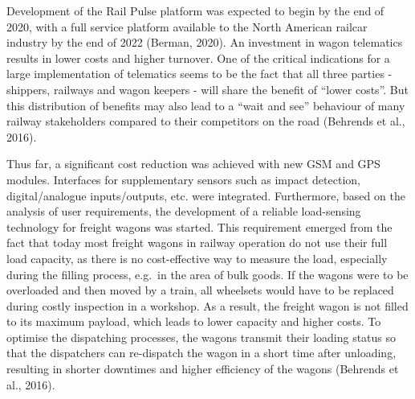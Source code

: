 \documentclass[
]{book}
\begin{document}
Development of the Rail Pulse platform was expected to begin by the end of 2020, with a full service platform available to the North American railcar industry by the end of 2022 (Berman, 2020).
An investment in wagon telematics results in lower costs and higher turnover. One of the critical indications for a large implementation of telematics seems to be the fact that all three parties - shippers, railways and wagon keepers - will share the benefit of ``lower costs''. But this distribution of benefits may also lead to a ``wait and see'' behaviour of many railway stakeholders compared to their competitors on the road (Behrends et al., 2016).

Thus far, a significant cost reduction was achieved with new GSM and GPS modules. Interfaces for supplementary sensors such as impact detection, digital/analogue inputs/outputs, etc. were integrated. Furthermore, based on the analysis of user requirements, the development of a reliable load-sensing technology for freight wagons was started. This requirement emerged from the fact that today most freight wagons in railway operation do not use their full load capacity, as there is no cost-effective way to measure the load, especially during the filling process, e.g.~in the area of bulk goods. If the wagons were to be overloaded and then moved by a train, all wheelsets would have to be replaced during costly inspection in a workshop. As a result, the freight wagon is not filled to its maximum payload, which leads to lower capacity and higher costs. To optimise the dispatching processes, the wagons transmit their loading status so that the dispatchers can re-dispatch the wagon in a short time after unloading, resulting in shorter downtimes and higher efficiency of the wagons (Behrends et al., 2016).
\end{document}
